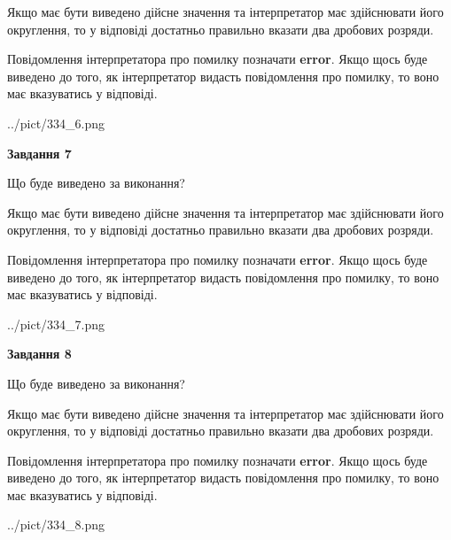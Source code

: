 \documentclass[12pt, ukrainian]{article}
\begin{document}
{\begin {Large}
Якщо має бути виведено дійсне значення та інтерпретатор має здійснювати його округлення, 
то у відповіді достатньо правильно вказати два дробових розряди.

Повідомлення інтерпретатора про помилку позначати \textbf{error}.
Якщо щось буде виведено до того, як інтерпретатор видасть повідомлення про помилку, 
то воно має вказуватись у відповіді. \par

\begin{center}
	{../pict/334_6.png}
\end{center}
\newpage

{\begin {center}\textbf{Завдання 7}\end {center}}\par
Що буде виведено за виконання? \par

Якщо має бути виведено дійсне значення та інтерпретатор має здійснювати його округлення, 
то у відповіді достатньо правильно вказати два дробових розряди.

Повідомлення інтерпретатора про помилку позначати \textbf{error}.
Якщо щось буде виведено до того, як інтерпретатор видасть повідомлення про помилку, 
то воно має вказуватись у відповіді. \par

\begin{center}
	{../pict/334_7.png}
\end{center}
\newpage

{\begin {center}\textbf{Завдання 8}\end {center}}\par
Що буде виведено за виконання? \par

Якщо має бути виведено дійсне значення та інтерпретатор має здійснювати його округлення, 
то у відповіді достатньо правильно вказати два дробових розряди.

Повідомлення інтерпретатора про помилку позначати \textbf{error}.
Якщо щось буде виведено до того, як інтерпретатор видасть повідомлення про помилку, 
то воно має вказуватись у відповіді. \par

\begin{center}
	{../pict/334_8.png}
\end{center}
\newpage


\end{Large}}
\end{document}
